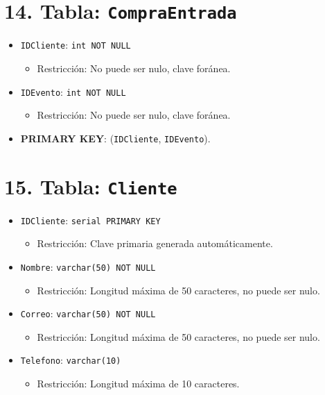 \section*{14. Tabla: \texttt{CompraEntrada}}
\begin{itemize}
    \item \texttt{IDCliente}: \texttt{int NOT NULL}
    \begin{itemize}
        \item Restricción: No puede ser nulo, clave foránea.
    \end{itemize}
    \item \texttt{IDEvento}: \texttt{int NOT NULL}
    \begin{itemize}
        \item Restricción: No puede ser nulo, clave foránea.
    \end{itemize}
    \item \textbf{PRIMARY KEY}: (\texttt{IDCliente}, \texttt{IDEvento}).
\end{itemize}

\section*{15. Tabla: \texttt{Cliente}}
\begin{itemize}
    \item \texttt{IDCliente}: \texttt{serial PRIMARY KEY}
    \begin{itemize}
        \item Restricción: Clave primaria generada automáticamente.
    \end{itemize}
    \item \texttt{Nombre}: \texttt{varchar(50) NOT NULL}
    \begin{itemize}
        \item Restricción: Longitud máxima de 50 caracteres, no puede ser nulo.
    \end{itemize}
    \item \texttt{Correo}: \texttt{varchar(50) NOT NULL}
    \begin{itemize}
        \item Restricción: Longitud máxima de 50 caracteres, no puede ser nulo.
    \end{itemize}
    \item \texttt{Telefono}: \texttt{varchar(10)}
    \begin{itemize}
        \item Restricción: Longitud máxima de 10 caracteres.
    \end{itemize}
\end{itemize}

